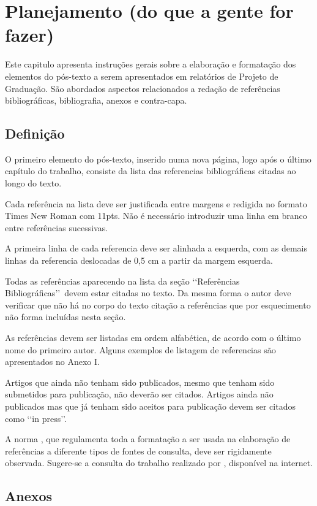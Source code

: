 \chapter[Planejamento (do que a gente for fazer)]{Planejamento (do que a gente for fazer)}

Este capitulo apresenta instruções gerais sobre a elaboração e formatação dos 
elementos do pós-texto a serem apresentados em relatórios de Projeto de 
Graduação. São abordados aspectos relacionados a redação de referências 
bibliográficas, bibliografia, anexos e contra-capa.

\section{Definição}

O primeiro elemento do pós-texto, inserido numa nova página, logo após o último 
capítulo do trabalho, consiste da lista das referencias bibliográficas citadas 
ao longo do texto.

Cada referência na lista deve ser justificada entre margens e redigida no 
formato Times New Roman com 11pts. Não é necessário introduzir uma linha em 
branco entre referências sucessivas.

A primeira linha de cada referencia deve ser alinhada a esquerda, com as demais 
linhas da referencia deslocadas de 0,5 cm a partir da margem esquerda. 

Todas as referências aparecendo na lista da seção \lq\lq Referências 
Bibliográficas\rq\rq\ devem estar citadas no texto. Da mesma forma o autor deve 
verificar que não há no corpo do texto citação a referências que por 
esquecimento não forma incluídas nesta seção.

As referências devem ser listadas em ordem alfabética, de acordo com o último 
nome do primeiro autor. Alguns exemplos de listagem de referencias são 
apresentados no Anexo I.

Artigos que ainda não tenham sido publicados, mesmo que tenham sido submetidos 
para publicação, não deverão ser citados. Artigos ainda não publicados mas que 
já tenham sido aceitos para publicação devem ser citados como \lq\lq in 
press\rq\rq.

A norma \cite{NBR6034:2000}, que regulamenta toda a formatação a ser usada na 
elaboração de referências a diferente tipos de fontes de consulta, deve ser 
rigidamente observada. Sugere-se a consulta do trabalho realizado por 
\cite{arruda2007}, disponível na internet.

\section{Anexos}


